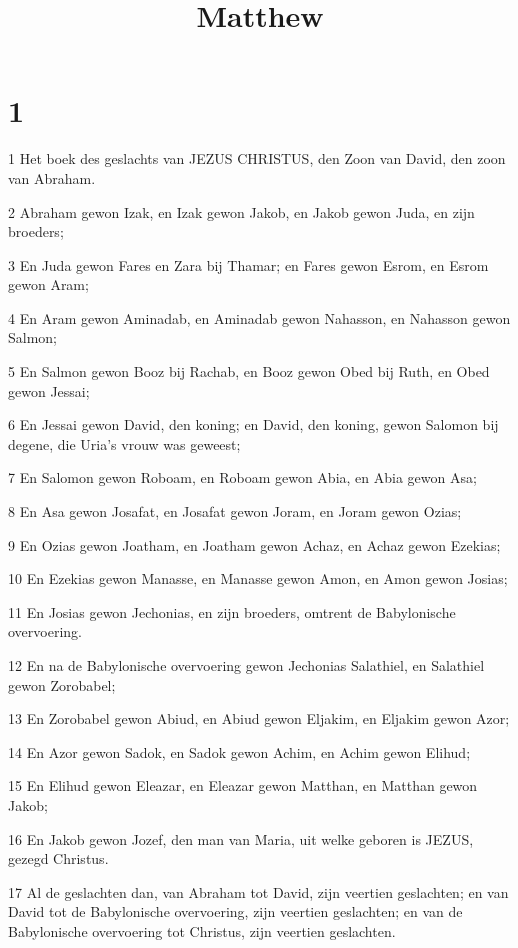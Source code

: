 

\title{Matthew}



\chapter{1}

\par 1 Het boek des geslachts van JEZUS CHRISTUS, den Zoon van David, den zoon van Abraham.
\par 2 Abraham gewon Izak, en Izak gewon Jakob, en Jakob gewon Juda, en zijn broeders;
\par 3 En Juda gewon Fares en Zara bij Thamar; en Fares gewon Esrom, en Esrom gewon Aram;
\par 4 En Aram gewon Aminadab, en Aminadab gewon Nahasson, en Nahasson gewon Salmon;
\par 5 En Salmon gewon Booz bij Rachab, en Booz gewon Obed bij Ruth, en Obed gewon Jessai;
\par 6 En Jessai gewon David, den koning; en David, den koning, gewon Salomon bij degene, die Uria's vrouw was geweest;
\par 7 En Salomon gewon Roboam, en Roboam gewon Abia, en Abia gewon Asa;
\par 8 En Asa gewon Josafat, en Josafat gewon Joram, en Joram gewon Ozias;
\par 9 En Ozias gewon Joatham, en Joatham gewon Achaz, en Achaz gewon Ezekias;
\par 10 En Ezekias gewon Manasse, en Manasse gewon Amon, en Amon gewon Josias;
\par 11 En Josias gewon Jechonias, en zijn broeders, omtrent de Babylonische overvoering.
\par 12 En na de Babylonische overvoering gewon Jechonias Salathiel, en Salathiel gewon Zorobabel;
\par 13 En Zorobabel gewon Abiud, en Abiud gewon Eljakim, en Eljakim gewon Azor;
\par 14 En Azor gewon Sadok, en Sadok gewon Achim, en Achim gewon Elihud;
\par 15 En Elihud gewon Eleazar, en Eleazar gewon Matthan, en Matthan gewon Jakob;
\par 16 En Jakob gewon Jozef, den man van Maria, uit welke geboren is JEZUS, gezegd Christus.
\par 17 Al de geslachten dan, van Abraham tot David, zijn veertien geslachten; en van David tot de Babylonische overvoering, zijn veertien geslachten; en van de Babylonische overvoering tot Christus, zijn veertien geslachten.
